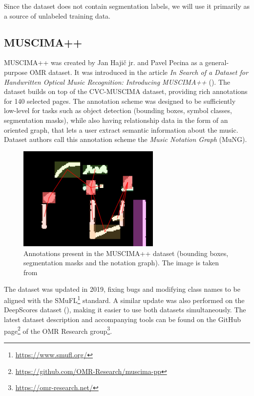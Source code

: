 Since the dataset does not contain segmentation labels, we will use it primarily as a source of unlabeled training data.


\subsection{MUSCIMA++}

MUSCIMA++ was created by Jan Hajič jr. and Pavel Pecina as a general-purpose OMR dataset. It was introduced in the article \emph{In Search of a Dataset for Handwritten Optical Music Recognition: Introducing MUSCIMA++} (\cite{MuscimaPP}). The dataset builds on top of the CVC-MUSCIMA dataset, providing rich annotations for 140 selected pages. The annotation scheme was designed to be sufficiently low-level for tasks such as object detection (bounding boxes, symbol classes, segmentation masks), while also having relationship data in the form of an oriented graph, that lets a user extract semantic information about the music. Dataset authors call this annotation scheme the \emph{Music Notation Graph} (MuNG).

\begin{figure}[ht]
    \centering
    \includegraphics[width=70mm]{../img/muscima-pp.png}
    \caption{Annotations present in the MUSCIMA++ dataset (bounding boxes, segmentation masks and the notation graph). The image is taken from \cite{MuscimaPP}}
    \label{fig:MuscimaPP}
\end{figure}

The dataset was updated in 2019, fixing bugs and modifying class names to be aligned with the SMuFL\footnote{\url{https://www.smufl.org/}} standard. A similar update was also performed on the DeepScores dataset (\cite{DeepScores}), making it easier to use both datasets simultaneously. The latest dataset description and accompanying tools can be found on the GitHub page\footnote{\url{https://github.com/OMR-Research/muscima-pp}} of the OMR Research group\footnote{\url{https://omr-research.net/}}.

